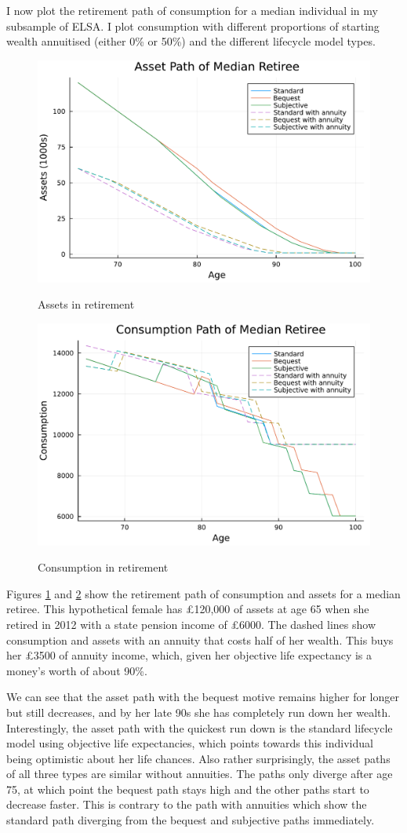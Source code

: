 \documentclass[12pt]{article}
\begin{document}
I now plot the retirement path of consumption for a median individual in my
subsample of ELSA. I plot consumption with different proportions of starting wealth
annuitised (either 0\% or 50\%) and the different lifecycle model types.

\begin{figure}[h]
    \caption{Assets in retirement}
    \centering
    \includegraphics[width=0.7\columnwidth]{figures/asset_plot_median_retiree.pdf}
    \label{fig:AssetPlot}
\end{figure}
\begin{figure}[h]
    \caption{Consumption in retirement}
    \centering
    \includegraphics[width=0.7\columnwidth]{figures/consumption_plot_median_retiree.pdf}
    \label{fig:ConsumpPlot}
\end{figure}

Figures \ref{fig:AssetPlot} and \ref{fig:ConsumpPlot} show the retirement path
of consumption and assets for a median retiree. This hypothetical female has
£120,000 of assets at age 65 when she retired in 2012 with a state pension
income of £6000. The dashed lines show consumption and assets with an annuity
that costs half of her wealth. This buys her £3500 of annuity income, which,
given her objective life expectancy is a money's worth of about 90\%.

We can see that the asset path with the bequest motive remains higher for longer
but still decreases, and by her late 90s she has completely run down her
wealth. Interestingly, the asset path with the quickest run down is the standard
lifecycle model using objective life expectancies, which points towards this
individual being optimistic about her life chances. Also rather surprisingly,
the asset paths of all three types are similar without annuities. The paths only
diverge after age 75, at which point the bequest path stays high and the other
paths start to decrease faster. This is contrary to the path with annuities
which show the standard path diverging from the bequest and subjective paths
immediately.
\end{document}
